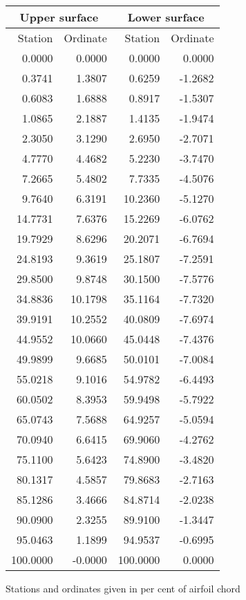 \documentclass[11pt]{book}
\begin{document}
 \hspace{4mm}
 \begin{tabular}{|r|r|r|r|} \hline 
 \multicolumn{2}{|c|}{Upper surface} & \multicolumn{2}{|c|}{Lower surface} \\
 \hline
 Station & Ordinate & Station & Ordinate \\
 \hline
0.0000 & 0.0000 & 0.0000 & 0.0000 \\
0.3741 & 1.3807 & 0.6259 & -1.2682 \\
0.6083 & 1.6888 & 0.8917 & -1.5307 \\
1.0865 & 2.1887 & 1.4135 & -1.9474 \\
2.3050 & 3.1290 & 2.6950 & -2.7071 \\
4.7770 & 4.4682 & 5.2230 & -3.7470 \\
7.2665 & 5.4802 & 7.7335 & -4.5076 \\
9.7640 & 6.3191 & 10.2360 & -5.1270 \\
14.7731 & 7.6376 & 15.2269 & -6.0762 \\
19.7929 & 8.6296 & 20.2071 & -6.7694 \\
24.8193 & 9.3619 & 25.1807 & -7.2591 \\
29.8500 & 9.8748 & 30.1500 & -7.5776 \\
34.8836 & 10.1798 & 35.1164 & -7.7320 \\
39.9191 & 10.2552 & 40.0809 & -7.6974 \\
44.9552 & 10.0660 & 45.0448 & -7.4376 \\
49.9899 & 9.6685 & 50.0101 & -7.0084 \\
55.0218 & 9.1016 & 54.9782 & -6.4493 \\
60.0502 & 8.3953 & 59.9498 & -5.7922 \\
65.0743 & 7.5688 & 64.9257 & -5.0594 \\
70.0940 & 6.6415 & 69.9060 & -4.2762 \\
75.1100 & 5.6423 & 74.8900 & -3.4820 \\
80.1317 & 4.5857 & 79.8683 & -2.7163 \\
85.1286 & 3.4666 & 84.8714 & -2.0238 \\
90.0900 & 2.3255 & 89.9100 & -1.3447 \\
95.0463 & 1.1899 & 94.9537 & -0.6995 \\
100.0000 & -0.0000 & 100.0000 & 0.0000 \\
 \hline 
 \end{tabular}
 \vspace{8mm}

Stations and ordinates given in per cent of airfoil chord
\end{document}
